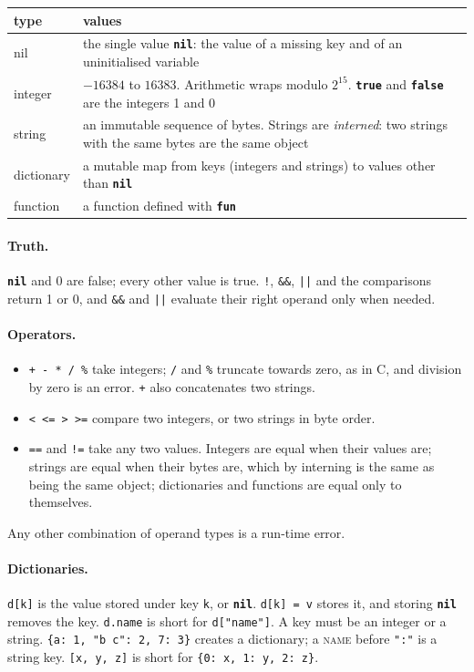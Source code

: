 \documentclass[11pt,a4paper]{article}
\newcommand{\kw}[1]{\textbf{\texttt{#1}}}
\newcommand{\tok}[1]{\texttt{"#1"}}
\begin{document}
\begin{center}
\small
\begin{tabularx}{\linewidth}{@{}l X@{}}
\toprule
type & values\\
\midrule
nil & the single value \kw{nil}: the value of a missing key and of an
  uninitialised variable\\
integer & $-16384$ to $16383$. Arithmetic wraps modulo $2^{15}$. \kw{true} and
  \kw{false} are the integers 1 and 0\\
string & an immutable sequence of bytes. Strings are \emph{interned}: two
  strings with the same bytes are the same object\\
dictionary & a mutable map from keys (integers and strings) to values other
  than \kw{nil}\\
function & a function defined with \kw{fun}\\
\bottomrule
\end{tabularx}
\end{center}

\paragraph{Truth.} \kw{nil} and 0 are false; every other value is true.
\verb|!|, \verb|&&|, \verb!||! and the comparisons return 1 or 0, and
\verb|&&| and \verb!||! evaluate their right operand only when needed.

\paragraph{Operators.}
\begin{itemize}[nosep]
\item \verb|+ - * / %| take integers; \verb|/| and \verb|%| truncate towards
  zero, as in C, and division by zero is an error. \verb|+| also
  concatenates two strings.
\item \verb|< <= > >=| compare two integers, or two strings in byte order.
\item \verb|==| and \verb|!=| take any two values. Integers are equal when
  their values are; strings are equal when their bytes are, which by
  interning is the same as being the same object; dictionaries and functions
  are equal only to themselves.
\end{itemize}
Any other combination of operand types is a run-time error.

\paragraph{Dictionaries.} \verb|d[k]| is the value stored under key
\verb|k|, or \kw{nil}. \verb|d[k] = v| stores it, and storing \kw{nil}
removes the key. \verb|d.name| is short for \verb|d["name"]|. A key must be
an integer or a string. \verb|{a: 1, "b c": 2, 7: 3}| creates a dictionary;
a \textsc{name} before \tok{:} is a string key. \verb|[x, y, z]| is short
for \verb|{0: x, 1: y, 2: z}|.
\end{document}
